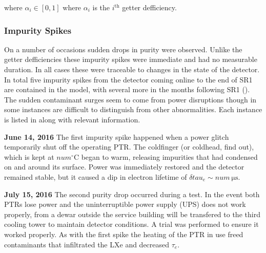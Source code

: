 \noindent where $\alpha_i \in [0, 1]$ where $\alpha_i$ is the $i^{\mathrm{th}}$ getter defficiency.



\subsubsection{Impurity Spikes}
\label{subsubsec:electron_lifetime_model_detector_effects_spikes}
On a number of occasions sudden drops in purity were observed.  Unlike the getter defficiencies these impurity spikes were immediate and
had no measurable duration.  In all cases these were traceable to changes in the state of the detector.  In total five impurity spikes
from the detector coming online to the end of SR1 are contained in the model, with several more in the months following SR1
(\secref{}).  The
sudden contaminant surges seem to come from power disruptions though in some instances are difficult to distinguish from other
abnormalities.  Each instance is listed in  along with relevant
information.

\textbf{June 14, 2016}  The first impurity spike happened when a power glitch temporarily shut off the operating PTR.  The coldfinger (or
coldhead, find out), which is kept at $num^{\circ} \mathrm{C}$ began to warm, releasing impurities that had condensed on and around its
surface.  Power was immediately restored and the detector remained stable, but it caused a dip in electron lifetime of
$\delta tau_e \sim num\ \mathrm{\mu s}$.

\textbf{July 15, 2016}  The second purity drop occurred during a \lntwo test.  In the event both PTRs lose power and the uninterruptible
power supply
(UPS) does not work properly, \lntwo from a dewar outside the service building will be transfered to the third cooling tower to maintain
detector conditions.  A trial was performed to ensure it worked properly.  As with the first spike the heating of the PTR in use freed
contaminants that infiltrated the LXe and decreased $\tau_e$.

